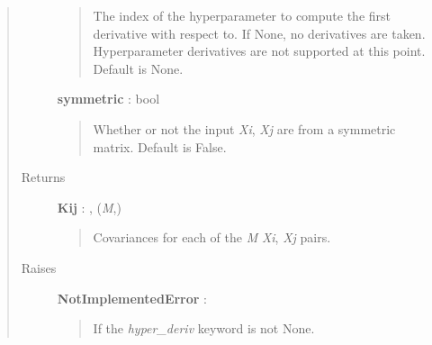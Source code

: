 \documentclass[letterpaper,10pt,english]{sphinxmanual}
\begin{document}
\begin{fulllineitems}
\begin{fulllineitems}
\begin{quote}
\begin{description}
\begin{quote}
The index of the hyperparameter to compute the first derivative
with respect to. If None, no derivatives are taken. Hyperparameter
derivatives are not supported at this point. Default is None.
\end{quote}

\textbf{symmetric} : bool
\begin{quote}

Whether or not the input \emph{Xi}, \emph{Xj} are from a symmetric matrix.
Default is False.
\end{quote}

\item[{Returns}] \leavevmode
\textbf{Kij} : , (\emph{M},)
\begin{quote}

Covariances for each of the \emph{M} \emph{Xi}, \emph{Xj} pairs.
\end{quote}

\item[{Raises}] \leavevmode
\textbf{NotImplementedError} :
\begin{quote}

If the \emph{hyper\_deriv} keyword is not None.
\end{quote}

\end{description}\end{quote}

\end{fulllineitems}


\end{fulllineitems}

\end{document}
